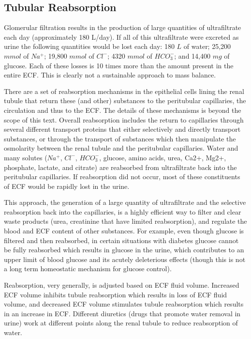 \subsection{Tubular Reabsorption}

Glomerular filtration results in the production of large quantities of ultrafiltrate each day (approximately  180 L/day). If all of this ultrafiltrate were excreted as urine the following quantities would be lost each day: 180 $L$ of water; 25,200 $mmol$ of $Na^+$; 19,800 $mmol$ of $Cl^−$; 4320 $mmol$ of $HCO_3^−$; and 14,400 $mg$ of glucose. Each of these losses is 10 times more than the amount present in the entire ECF. This is clearly not a sustainable approach to mass balance. 

There are a set of reabsorption mechanisms in the epithelial cells lining the renal tubule that return these (and other) substances to the peritubular capillaries, the circulation and thus to the ECF. The details of these mechanisms is beyond the scope of this text. Overall reabsorption includes the return to capillaries through several different transport proteins that either selectively and directly transport substances, or through the transport of substances which then manipulate the osmolarity between the renal tubule and the peritubular capillaries.  Water and many solutes ($Na^+$, $Cl^-$, $HCO_3^−$, glucose, amino acids, urea, Ca2+, Mg2+, phosphate, lactate, and citrate) are reabsorbed from ultrafiltrate back into the peritubular capillaries. If reabsorption did not occur, most of these constituents of ECF would be rapidly lost in the urine.

This approach, the generation of a large quantity of ultrafiltrate and the selective reabsorption back into the capillaries, is a highly efficient way to filter and clear waste products (urea, creatinine that have limited reabsorption), and regulate the blood and ECF content of other substances. For example, even though glucose is filtered and then reabsorbed, in certain situations with diabetes glucose cannot be fully reabsorbed which results in glucose in the urine, which contributes to an upper limit of blood glucose and its acutely deleterious effects (though this is not a long term homeostatic mechanism for glucose control). 

Reabsorption, very generally, is adjusted based on ECF fluid volume. Increased ECF volume inhibits tubule reabsorption which results in loss of ECF fluid volume, and decreased ECF volume stimulates tubule reabsorption which results in an increase in ECF. Different diuretics (drugs that promote water removal in urine) work at different points along the renal tubule to reduce reabsorption of water.


